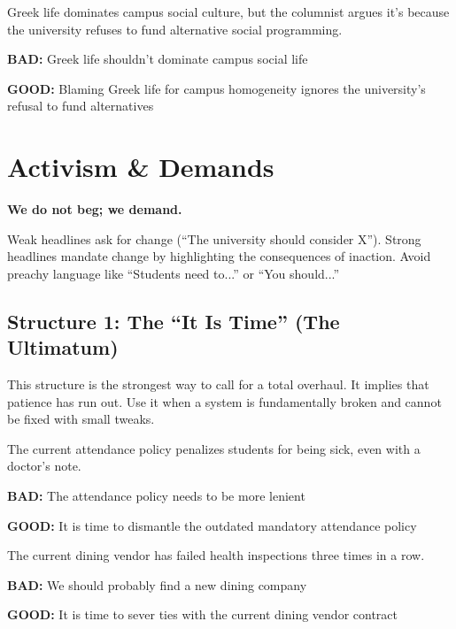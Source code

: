 \documentclass[12pt]{article}
\newcommand{\bad}[1]{\textbf{\textcolor{rose}{BAD:}} #1}
\newcommand{\good}[1]{\textbf{\textcolor{congaree}{GOOD:}} #1}
\newcommand{\context}[1]{#1}
\begin{document}
\begin{exampleblock}
\context{Greek life dominates campus social culture, but the columnist argues it's because the university refuses to fund alternative social programming.}

\bad{Greek life shouldn't dominate campus social life}

\good{Blaming Greek life for campus homogeneity ignores the university's refusal to fund alternatives}
\end{exampleblock}

\newpage

\section{Activism \& Demands}

\begin{principalbox}
\textbf{We do not beg; we demand.}

Weak headlines ask for change (``The university should consider X''). Strong headlines mandate change by highlighting the consequences of inaction. Avoid preachy language like ``Students need to...'' or ``You should...''
\end{principalbox}

\subsection{Structure 1: The ``It Is Time'' (The Ultimatum)}
This structure is the strongest way to call for a total overhaul. It implies that patience has run out. Use it when a system is fundamentally broken and cannot be fixed with small tweaks.

\begin{exampleblock}
\context{The current attendance policy penalizes students for being sick, even with a doctor's note.}

\bad{The attendance policy needs to be more lenient}

\good{It is time to dismantle the outdated mandatory attendance policy}
\end{exampleblock}

\begin{exampleblock}
\context{The current dining vendor has failed health inspections three times in a row.}

\bad{We should probably find a new dining company}

\good{It is time to sever ties with the current dining vendor contract}
\end{exampleblock}
\end{document}
